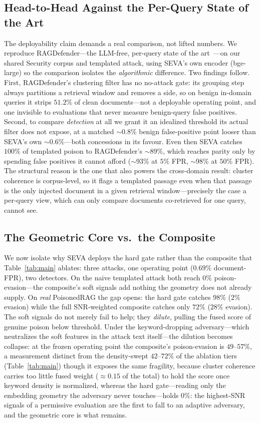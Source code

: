 \documentclass[10pt,journal,compsoc]{IEEEtran}
\begin{document}
\subsection{Head-to-Head Against the Per-Query State of the Art}
\label{subsec:h2h}
The deployability claim demands a real comparison, not lifted numbers. We reproduce
RAGDefender---the LLM-free, per-query state of the art~\cite{ragdefender}---on our shared
Security corpus and templated attack, using SEVA's own encoder (bge-large) so the comparison
isolates the \emph{algorithmic} difference. Two findings follow. First,
RAGDefender's clustering filter has no no-attack gate: its grouping step always partitions a
retrieval window and removes a side, so on benign in-domain queries it strips $51.2\%$ of clean
documents---not a deployable operating point, and one invisible to evaluations that never
measure benign-query false positives. Second, to compare \emph{detection} at all we grant it an
idealized threshold its actual filter does not expose, at a matched $\sim$0.8\% benign
false-positive point looser than SEVA's own $\sim$0.6\%---both concessions in its favour. Even
then SEVA catches $100\%$ of templated poison to RAGDefender's $\sim$89\%, which reaches parity
only by spending false positives it cannot afford ($\sim$93\% at $5\%$ FPR, $\sim$98\% at
$50\%$ FPR).
The structural reason is the one that also powers the cross-domain result: cluster
coherence is corpus-level, so it flags a templated passage even when that passage
is the only injected document in a given retrieval window---precisely the case a
per-query view, which can only compare documents co-retrieved for one query, cannot
see.

\subsection{The Geometric Core vs.\ the Composite}
\label{subsec:core}
We now isolate why SEVA deploys the hard gate rather than the
composite that Table~\ref{tab:main} ablates: three attacks, one operating point
($0.69\%$ document-FPR), two detectors. On the naive templated attack both reach
$0\%$ poison-evasion---the composite's soft signals add nothing the geometry does not
already supply. On \emph{real} PoisonedRAG the gap opens: the hard gate catches $98\%$
($2\%$ evasion) while the full SNR-weighted composite catches only $72\%$ ($28\%$ evasion).
The soft signals do not merely fail to help; they \emph{dilute}, pulling the fused
score of genuine poison below threshold.
Under the keyword-dropping adversary---which neutralizes the soft features in the attack
text itself---the dilution becomes collapse: at the frozen operating point the composite's
poison-evasion is $49$--$57\%$, a measurement distinct from the
density-swept $42$--$72\%$ of the ablation tiers (Table~\ref{tab:main}) though it exposes the
same fragility, because cluster coherence carries too little fused weight
($\approx\!0.15$ of the total) to hold the score once keyword density is normalized,
whereas the hard gate---reading only the embedding geometry the adversary never
touches---holds $0\%$: the highest-SNR signals of a permissive evaluation are the
first to fall to an adaptive adversary, and the geometric core is what remains.
\end{document}
